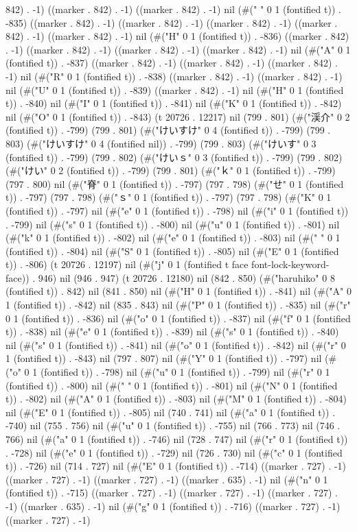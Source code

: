 842) . -1) ((marker . 842) . -1) ((marker . 842) . -1) nil (#(" " 0 1 (fontified t)) . -835) ((marker . 842) . -1) ((marker . 842) . -1) ((marker . 842) . -1) ((marker . 842) . -1) ((marker . 842) . -1) nil (#("H" 0 1 (fontified t)) . -836) ((marker . 842) . -1) ((marker . 842) . -1) ((marker . 842) . -1) ((marker . 842) . -1) nil (#("A" 0 1 (fontified t)) . -837) ((marker . 842) . -1) ((marker . 842) . -1) ((marker . 842) . -1) nil (#("R" 0 1 (fontified t)) . -838) ((marker . 842) . -1) ((marker . 842) . -1) nil (#("U" 0 1 (fontified t)) . -839) ((marker . 842) . -1) nil (#("H" 0 1 (fontified t)) . -840) nil (#("I" 0 1 (fontified t)) . -841) nil (#("K" 0 1 (fontified t)) . -842) nil (#("O" 0 1 (fontified t)) . -843) (t 20726 . 12217) nil (799 . 801) (#("渓介" 0 2 (fontified t)) . -799) (799 . 801) (#("けいすけ" 0 4 (fontified t)) . -799) (799 . 803) (#("けいすけ" 0 4 (fontified nil)) . -799) (799 . 803) (#("けいす" 0 3 (fontified t)) . -799) (799 . 802) (#("けいｓ" 0 3 (fontified t)) . -799) (799 . 802) (#("けい" 0 2 (fontified t)) . -799) (799 . 801) (#("ｋ" 0 1 (fontified t)) . -799) (797 . 800) nil (#("脊" 0 1 (fontified t)) . -797) (797 . 798) (#("せ" 0 1 (fontified t)) . -797) (797 . 798) (#("ｓ" 0 1 (fontified t)) . -797) (797 . 798) (#("K" 0 1 (fontified t)) . -797) nil (#("e" 0 1 (fontified t)) . -798) nil (#("i" 0 1 (fontified t)) . -799) nil (#("s" 0 1 (fontified t)) . -800) nil (#("u" 0 1 (fontified t)) . -801) nil (#("k" 0 1 (fontified t)) . -802) nil (#("e" 0 1 (fontified t)) . -803) nil (#(" " 0 1 (fontified t)) . -804) nil (#("S" 0 1 (fontified t)) . -805) nil (#("E" 0 1 (fontified t)) . -806) (t 20726 . 12197) nil (#("j" 0 1 (fontified t face font-lock-keyword-face)) . 946) nil (946 . 947) (t 20726 . 12180) nil (842 . 850) (#("haruhiko" 0 8 (fontified t)) . 842) nil (841 . 850) nil (#("H" 0 1 (fontified t)) . -841) nil (#("A" 0 1 (fontified t)) . -842) nil (835 . 843) nil (#("P" 0 1 (fontified t)) . -835) nil (#("r" 0 1 (fontified t)) . -836) nil (#("o" 0 1 (fontified t)) . -837) nil (#("f" 0 1 (fontified t)) . -838) nil (#("e" 0 1 (fontified t)) . -839) nil (#("s" 0 1 (fontified t)) . -840) nil (#("s" 0 1 (fontified t)) . -841) nil (#("o" 0 1 (fontified t)) . -842) nil (#("r" 0 1 (fontified t)) . -843) nil (797 . 807) nil (#("Y" 0 1 (fontified t)) . -797) nil (#("o" 0 1 (fontified t)) . -798) nil (#("u" 0 1 (fontified t)) . -799) nil (#("r" 0 1 (fontified t)) . -800) nil (#(" " 0 1 (fontified t)) . -801) nil (#("N" 0 1 (fontified t)) . -802) nil (#("A" 0 1 (fontified t)) . -803) nil (#("M" 0 1 (fontified t)) . -804) nil (#("E" 0 1 (fontified t)) . -805) nil (740 . 741) nil (#("a" 0 1 (fontified t)) . -740) nil (755 . 756) nil (#("u" 0 1 (fontified t)) . -755) nil (766 . 773) nil (746 . 766) nil (#("a" 0 1 (fontified t)) . -746) nil (728 . 747) nil (#("r" 0 1 (fontified t)) . -728) nil (#("e" 0 1 (fontified t)) . -729) nil (726 . 730) nil (#("c" 0 1 (fontified t)) . -726) nil (714 . 727) nil (#("E" 0 1 (fontified t)) . -714) ((marker . 727) . -1) ((marker . 727) . -1) ((marker . 727) . -1) ((marker . 635) . -1) nil (#("n" 0 1 (fontified t)) . -715) ((marker . 727) . -1) ((marker . 727) . -1) ((marker . 727) . -1) ((marker . 635) . -1) nil (#("g" 0 1 (fontified t)) . -716) ((marker . 727) . -1) ((marker . 727) . -1) 
